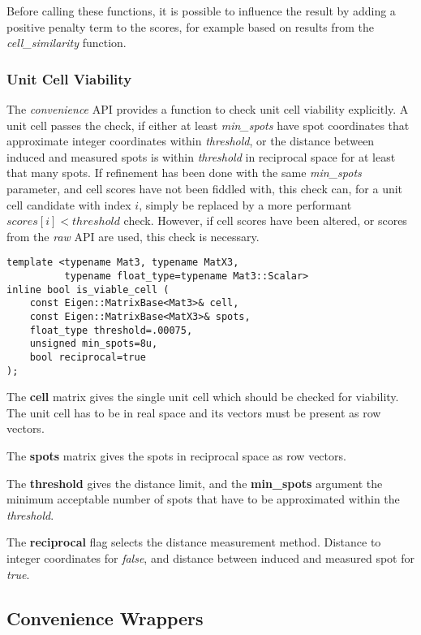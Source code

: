 \documentclass[a4paper,10pt]{article}
\begin{document}
Before calling these functions, it is possible to influence the result by adding a positive penalty term to the scores, for example based on results from the \emph{cell\_similarity} function.

\subsubsection{Unit Cell Viability}

The \emph{convenience} API provides a function to check unit cell viability explicitly. A unit cell passes the check, if either at least \emph{min\_spots} have spot coordinates that approximate integer coordinates within \emph{threshold}, or the distance between induced and measured spots is within \emph{threshold} in reciprocal space for at least that many spots. If refinement has been done with the same \emph{min\_spots} parameter, and cell scores have not been fiddled with, this check can, for a unit cell candidate with index $i$, simply be replaced by a more performant $scores[i] < threshold$ check. However, if cell scores have been altered, or scores from the \emph{raw} API are used, this check is necessary.
%
\begin{lstlisting}
template <typename Mat3, typename MatX3,
          typename float_type=typename Mat3::Scalar>
inline bool is_viable_cell (
    const Eigen::MatrixBase<Mat3>& cell,
    const Eigen::MatrixBase<MatX3>& spots,
    float_type threshold=.00075,
    unsigned min_spots=8u,
    bool reciprocal=true
);
\end{lstlisting}

The \textbf{cell} matrix gives the single unit cell which should be checked for viability. The unit cell has to be in real space and its vectors must be present as row vectors.

The \textbf{spots} matrix gives the spots in reciprocal space as row vectors.

The \textbf{threshold} gives the distance limit, and the \textbf{min\_spots} argument the minimum acceptable number of spots that have to be approximated within the \emph{threshold}.

The \textbf{reciprocal} flag selects the distance measurement method. Distance to integer coordinates for \emph{false}, and distance between induced and measured spot for \emph{true}.

\subsection{Convenience Wrappers}
\end{document}
